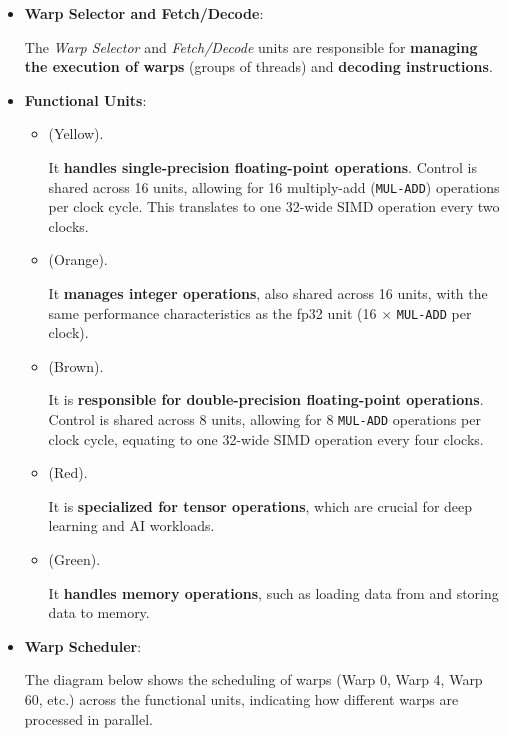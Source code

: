 \begin{itemize}
    \item \textbf{Warp Selector and Fetch/Decode}:
    
    The \emph{Warp Selector} and \emph{Fetch/Decode} units are responsible for \textbf{managing the execution of warps} (groups of threads) and \textbf{decoding instructions}.


    \item \textbf{Functional Units}:
    \begin{itemize}
        \item {} (Yellow).
        
        It \textbf{handles single-precision floating-point operations}. Control is shared across 16 units, allowing for 16 multiply-add (\texttt{MUL-ADD}) operations per clock cycle. This translates to one 32-wide SIMD operation every two clocks.


        \item {} (Orange). 
        
        It \textbf{manages integer operations}, also shared across 16 units, with the same performance characteristics as the fp32 unit (16 $\times$ \texttt{MUL-ADD} per clock).
        

        \item {} (Brown). 
        
        It is \textbf{responsible for double-precision floating-point operations}. Control is shared across 8 units, allowing for 8 \texttt{MUL-ADD} operations per clock cycle, equating to one 32-wide SIMD operation every four clocks.
        

        \item {} (Red). 
        
        It is \textbf{specialized for tensor operations}, which are crucial for deep learning and AI workloads.
        

        \item {} (Green). 
        
        It \textbf{handles memory operations}, such as loading data from and storing data to memory.
    \end{itemize}


    \item \textbf{Warp Scheduler}:

    The diagram below shows the scheduling of warps (Warp 0, Warp 4, Warp 60, etc.) across the functional units, indicating how different warps are processed in parallel.
\end{itemize}

